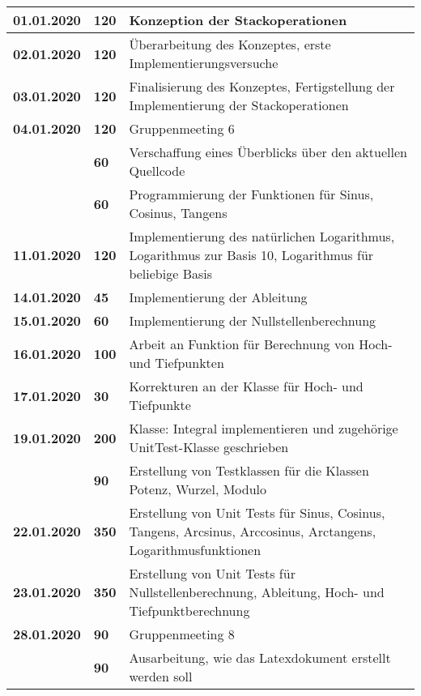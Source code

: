 {\begin{longtable}{|l|l|p{11cm}|}
		\\ \hline \textbf{01.01.2020}
		& \textbf{\hfill 120} & Konzeption der Stackoperationen
		\\ \hline \textbf{02.01.2020}
		& \textbf{\hfill 120} & Überarbeitung des Konzeptes, erste Implementierungsversuche
		\\ \hline \textbf{03.01.2020}
		& \textbf{\hfill 120} & Finalisierung des Konzeptes, Fertigstellung der Implementierung der Stackoperationen 
		\\ \hline \textbf{04.01.2020}
		& \textbf{\hfill 120} & Gruppenmeeting 6 \\\cline{2-3}
		& \textbf{\hfill 60} & Verschaffung eines Überblicks über den aktuellen Quellcode \\\cline{2-3}
		& \textbf{\hfill 60} & Programmierung der Funktionen für Sinus, Cosinus, Tangens
		\\ \hline \textbf{11.01.2020}
		& \textbf{\hfill 120} & Implementierung des natürlichen Logarithmus, Logarithmus zur Basis 10, Logarithmus für beliebige Basis
		\\ \hline \textbf{14.01.2020}
		& \textbf{\hfill 45} & Implementierung der Ableitung
		\\ \hline \textbf{15.01.2020}
		& \textbf{\hfill 60} & Implementierung der Nullstellenberechnung
		\\ \hline \textbf{16.01.2020}
		& \textbf{\hfill 100} & Arbeit an Funktion für Berechnung von Hoch- und Tiefpunkten
		\\ \hline \textbf{17.01.2020}
		& \textbf{\hfill 30} & Korrekturen an der Klasse für Hoch- und Tiefpunkte
		\\ \hline \textbf{19.01.2020}
		& \textbf{\hfill 200} & Klasse: Integral implementieren und zugehörige UnitTest-Klasse geschrieben \\\cline{2-3}
		& \textbf{\hfill 90} & Erstellung von Testklassen für die Klassen Potenz, Wurzel, Modulo
		\\ \hline \textbf{22.01.2020}
		& \textbf{\hfill 350} & Erstellung von Unit Tests für Sinus, Cosinus, Tangens, Arcsinus, Arccosinus, Arctangens, Logarithmusfunktionen
		\\ \hline \textbf{23.01.2020}
		& \textbf{\hfill 350} & Erstellung von Unit Tests für Nullstellenberechnung, Ableitung, Hoch- und Tiefpunktberechnung
		\\ \hline \textbf{28.01.2020}
		& \textbf{\hfill 90} & Gruppenmeeting 8 \\\cline{2-3}
		& \textbf{\hfill 90} & Ausarbeitung, wie das Latexdokument erstellt werden soll  \\\cline{2-3}

\end{longtable}}

